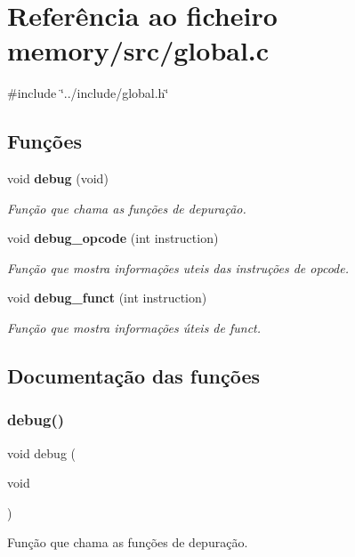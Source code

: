 \section{Referência ao ficheiro memory/src/global.c}
\label{global_8c}
{\ttfamily \#include \char`\"{}../include/global.\+h\char`\"{}}\newline
\subsection*{Funções}
\begin{DoxyCompactItemize}
\item 
void \textbf{ debug} (void)
\begin{DoxyCompactList}\small\item\em Função que chama as funções de depuração. \end{DoxyCompactList}\item 
void \textbf{ debug\+\_\+opcode} (int instruction)
\begin{DoxyCompactList}\small\item\em Função que mostra informações uteis das instruções de opcode. \end{DoxyCompactList}\item 
void \textbf{ debug\+\_\+funct} (int instruction)
\begin{DoxyCompactList}\small\item\em Função que mostra informações úteis de funct. \end{DoxyCompactList}\end{DoxyCompactItemize}


\subsection{Documentação das funções}
\mbox{\label{global_8c_a146ba59440b7ebfb099f2ceb23d0a60f}} 
\subsubsection{debug()}
{\footnotesize\ttfamily void debug (\begin{DoxyParamCaption}\item[{void}]{ }\end{DoxyParamCaption})}



Função que chama as funções de depuração. 

